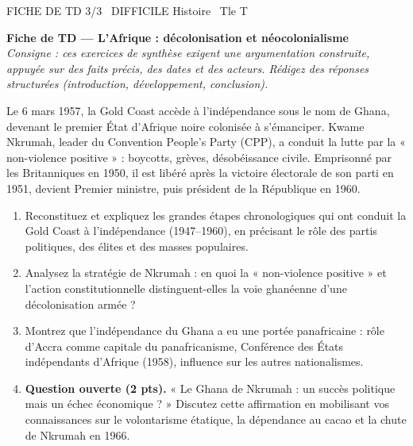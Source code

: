 \documentclass[11pt]{article}
\begin{document}
\begin{tcolorbox}[enhanced,colback=popink,colframe=popink,arc=10pt,boxrule=0pt,left=12pt,right=12pt,top=9pt,bottom=9pt]
{\color{white}\popxbold\small FICHE DE TD 3/3 \textbullet\ DIFFICILE \hfill Histoire \textbullet\ Tle T\par}
\end{tcolorbox}
\vspace{4pt}
\textbf{Fiche de TD — L'Afrique : décolonisation et néocolonialisme}\\
\textit{Consigne : ces exercices de synthèse exigent une argumentation construite, appuyée sur des faits précis, des dates et des acteurs. Rédigez des réponses structurées (introduction, développement, conclusion).}

\begin{exercice}
Le 6 mars 1957, la Gold Coast accède à l'indépendance sous le nom de Ghana, devenant le premier État d'Afrique noire colonisée à s'émanciper. Kwame Nkrumah, leader du Convention People's Party (CPP), a conduit la lutte par la « non-violence positive » : boycotts, grèves, désobéissance civile. Emprisonné par les Britanniques en 1950, il est libéré après la victoire électorale de son parti en 1951, devient Premier ministre, puis président de la République en 1960.
\begin{enumerate}
\item Reconstituez et expliquez les grandes étapes chronologiques qui ont conduit la Gold Coast à l'indépendance (1947--1960), en précisant le rôle des partis politiques, des élites et des masses populaires.
\item Analysez la stratégie de Nkrumah : en quoi la « non-violence positive » et l'action constitutionnelle distinguent-elles la voie ghanéenne d'une décolonisation armée ?
\item Montrez que l'indépendance du Ghana a eu une portée panafricaine : rôle d'Accra comme capitale du panafricanisme, Conférence des États indépendants d'Afrique (1958), influence sur les autres nationalismes.
\item \textbf{Question ouverte (2 pts).} « Le Ghana de Nkrumah : un succès politique mais un échec économique ? » Discutez cette affirmation en mobilisant vos connaissances sur le volontarisme étatique, la dépendance au cacao et la chute de Nkrumah en 1966.
\end{enumerate}
\end{exercice}
\end{document}
